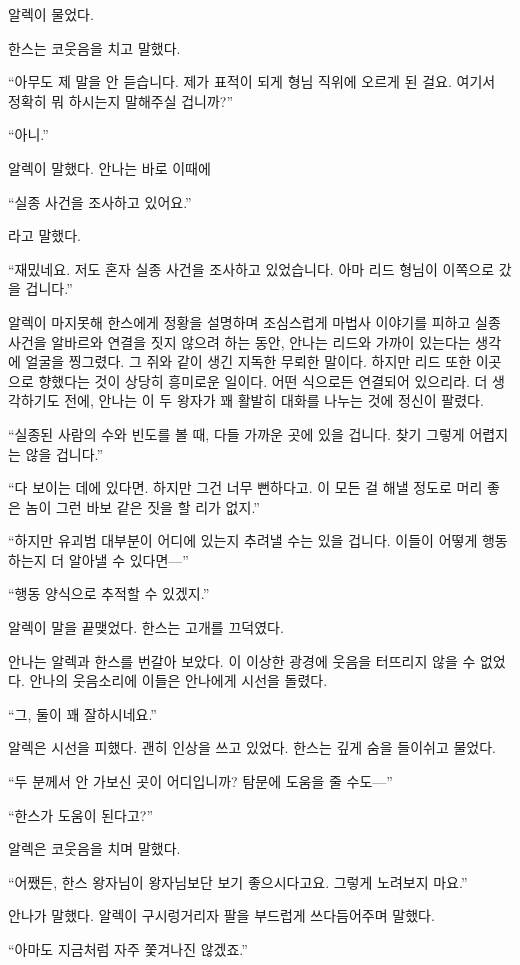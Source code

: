 알렉이 물었다.

한스는 코웃음을 치고 말했다.

``아무도 제 말을 안 듣습니다. 제가 표적이 되게 형님 직위에 오르게 된 걸요. 여기서 정확히 뭐 하시는지 말해주실 겁니까?''

``아니.''

알렉이 말했다. 안나는 바로 이때에

``실종 사건을 조사하고 있어요.''

라고 말했다.

``재밌네요. 저도 혼자 실종 사건을 조사하고 있었습니다. 아마 리드 형님이 이쪽으로 갔을 겁니다.''

알렉이 마지못해 한스에게 정황을 설명하며 조심스럽게 마법사 이야기를 피하고 실종 사건을 알바르와 연결을 짓지 않으려 하는 동안, 안나는 리드와 가까이 있는다는 생각에 얼굴을 찡그렸다. 그 쥐와 같이 생긴 지독한 무뢰한 말이다. 하지만 리드 또한 이곳으로 향했다는 것이 상당히 흥미로운 일이다. 어떤 식으로든 연결되어 있으리라. 더 생각하기도 전에, 안나는 이 두 왕자가 꽤 활발히 대화를 나누는 것에 정신이 팔렸다.

``실종된 사람의 수와 빈도를 볼 때, 다들 가까운 곳에 있을 겁니다. 찾기 그렇게 어렵지는 않을 겁니다.''

``다 보이는 데에 있다면. 하지만 그건 너무 뻔하다고. 이 모든 걸 해낼 정도로 머리 좋은 놈이 그런 바보 같은 짓을 할 리가 없지.''

``하지만 유괴범 대부분이 어디에 있는지 추려낼 수는 있을 겁니다. 이들이 어떻게 행동하는지 더 알아낼 수 있다면—''

``행동 양식으로 추적할 수 있겠지.''

알렉이 말을 끝맺었다. 한스는 고개를 끄덕였다.

안나는 알렉과 한스를 번갈아 보았다. 이 이상한 광경에 웃음을 터뜨리지 않을 수 없었다. 안나의 웃음소리에 이들은 안나에게 시선을 돌렸다.

``그, 둘이 꽤 잘하시네요.''

알렉은 시선을 피했다. 괜히 인상을 쓰고 있었다. 한스는 깊게 숨을 들이쉬고 물었다.

``두 분께서 안 가보신 곳이 어디입니까? 탐문에 도움을 줄 수도—''

``한스가 도움이 된다고?''

알렉은 코웃음을 치며 말했다.

``어쨌든, 한스 왕자님이 왕자님보단 보기 좋으시다고요. 그렇게 노려보지 마요.''

안나가 말했다. 알렉이 구시렁거리자 팔을 부드럽게 쓰다듬어주며 말했다.

``아마도 지금처럼 자주 쫓겨나진 않겠죠.''

